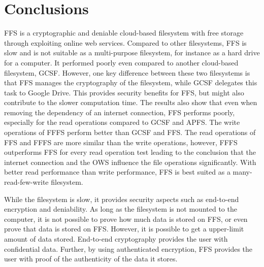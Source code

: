 
\section{Conclusions}
\label{sec:conclusions}
  


\gls{FFS} is a cryptographic and deniable \mbox{cloud-based} filesystem with free storage through exploiting online web services. Compared to other filesystems, \gls{FFS} is slow and is not suitable as a \mbox{multi-purpose} filesystem, for instance as a hard drive for a computer. It performed poorly even compared to another \mbox{cloud-based} filesystem, \gls{GCSF}. However, one key difference between these two filesystems is that \gls{FFS} manages the cryptography of the filesystem, while \gls{GCSF} delegates this task to Google Drive. This provides security benefits for \gls{FFS}, but might also contribute to the slower computation time. The results also show that even when removing the dependency of an internet connection, \gls{FFS} performs poorly, especially for the read operations compared to \gls{GCSF} and \gls{APFS}. The write operations of \gls{FFFS} perform better than \gls{GCSF} and \gls{FFS}. The read operations of \gls{FFS} and \gls{FFFS} are more similar than the write operations, however, \gls{FFFS} outperforms \gls{FFS} for every read operation test leading to the conclusion that the internet connection and the \gls{OWS} influence the file operations significantly. With better read performance than write performance, \gls{FFS} is best suited as a \mbox{many-read-few-write} filesystem.

While the filesystem is slow, it provides security aspects such as \mbox{end-to-end} encryption and deniability. As long as the filesystem is not mounted to the computer, it is not possible to prove how much data is stored on \gls{FFS}, or even prove that data is stored on \gls{FFS}. However, it is possible to get a upper-limit amount of data stored. \mbox{End-to-end} cryptography provides the user with confidential data. Further, by using authenticated encryption, \gls{FFS} provides the user with proof of the authenticity of the data it stores. 

